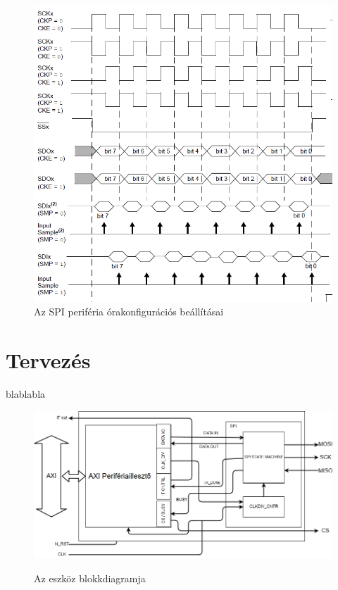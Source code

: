 \documentclass[a4paper,11pt]{article}
\begin{document}
\begin{figure}[H]
	\begin{center}
	\includegraphics[scale=2]{spi_clkdiag.png}
	\caption{Az SPI periféria órakonfigurációs beállításai}
	\label{fig:spi_clkdiag}
	\end{center}
\end{figure}

\section{Tervezés}

blablabla

\begin{figure}[H]
	\begin{center}
	\includegraphics[scale=0.5]{system_blockdesign.png}
	\label{fig:system_main}
	\end{center}
	\caption{Az eszköz blokkdiagramja}
\end{figure}
\end{document}
